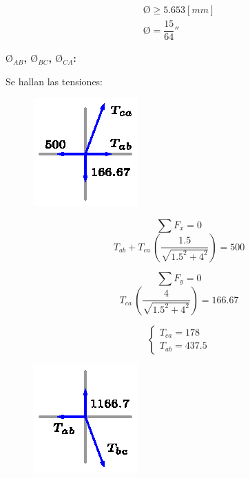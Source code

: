 \documentclass[letter,10pt,twoside]{article}
\begin{document}
\begin{equation*}
\boxed{
    \begin{array}{l}
        \text{\O} \ge 5.653[mm] \\
        \text{\O} = \dfrac{15}{64}''
    \end{array}
}
\end{equation*}

\textbf{$\text{\O}_{AB}$, $\text{\O}_{BC}$, $\text{\O}_{CA}$:}

Se hallan las tensiones:

\begin{figure}[H]
\centering
\includegraphics[scale=1.8]{resources/x0401.eps}
\end{figure}

\begin{equation*}
    \sum{F_x} = 0
\end{equation*}
\begin{equation*}
    T_{ab} + T_{ca}\,\left(\frac{1.5}{\sqrt{1.5^2+4^2}}\right) = 500
\end{equation*}

\begin{equation*}
    \sum{F_y} = 0
\end{equation*}
\begin{equation*}
    T_{ca}\,\left(\frac{4}{\sqrt{1.5^2+4^2}}\right) = 166.67
\end{equation*}

\begin{equation*}
    \begin{cases}
        T_{ca} = 178 \\
        T_{ab} = 437.5
    \end{cases}
\end{equation*}

\begin{figure}[H]
\centering
\includegraphics[scale=1.8]{resources/x0402.eps}
\end{figure}
\end{document}

